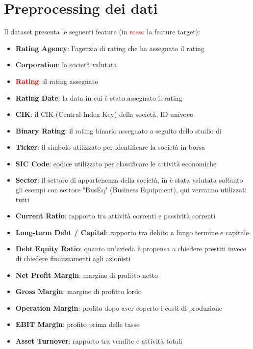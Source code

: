 \section{Preprocessing dei dati}

\noindent Il dataset presenta le seguenti feature (in \textcolor{red}{rosso} la feature target):

\begin{itemize}[label=-]
    \item \textbf{Rating Agency}: l'agenzia di rating che ha assegnato il rating
    \item \textbf{Corporation}: la società valutata
    \item \textcolor{red}{\textbf{Rating}}: il rating assegnato
    \item \textbf{Rating Date}: la data in cui è stato assegnato il rating
    \item \textbf{CIK}: il CIK (Central Index Key) della società, ID univoco
    \item \textbf{Binary Rating}: il rating binario assegnato a seguito dello studio di \cite{makwana2022get}
    \item \textbf{Ticker}: il simbolo utilizzato per identificare la società in borsa
    \item \textbf{SIC Code}: codice utilizzato per classificare le attività economiche
    \item \textbf{Sector}: il settore di appartenenza della società, in \cite{makwana2022get} è stata valutata soltanto gli esempi con settore "BusEq" (Business Equipment), qui verranno utilizzati tutti
    \item \textbf{Current Ratio}: rapporto tra attività correnti e passività correnti
    \item \textbf{Long-term Debt / Capital}: rapporto tra debito a lungo termine e capitale
    \item \textbf{Debt Equity Ratio}: quanto un'azieda è propensa a chiedere prestiti invece di chiedere finanziamenti agli azionisti
    \item \textbf{Net Profit Margin}: margine di profitto netto
    \item \textbf{Gross Margin}: margine di profitto lordo
    \item \textbf{Operation Margin}: profito dopo aver coperto i costi di produzione
    \item \textbf{EBIT Margin}: profito prima delle tasse
    \item \textbf{Asset Turnover}: rapporto tra vendite e attività totali

\end{itemize}
